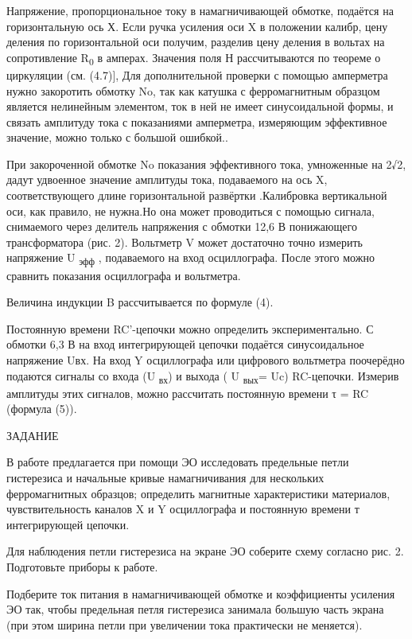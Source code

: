 \documentclass[]{article}
\begin{document}
Напряжение, пропорциональное току в намагничивающей обмотке, подаётся на
горизонтальную ось Х. Если ручка усиления оси X в положении калибр, цену
деления по горизонтальной оси получим, разделив цену деления в вольтах
на сопротивление R\textsubscript{0} в амперах. Значения поля Н
рассчитыва­ются по теореме о циркуляции (см. (4.7){]}, Для
дополнительной проверки с помощью амперметра нужно закоротить обмотку
No, так как катушка с ферромагнитным образцом является нелинейным
элементом, ток в ней не име­ет синусоидальной формы, и связать амплитуду
тока с показаниями амперметра, измеряющим эффективное значение, можно
только с большой ошибкой..

При закороченной обмотке No показания эффективного тока, умноженные на
2√2, дадут удвоенное значение амплитуды тока, подаваемого на ось X,
соответствующего длине горизонтальной развёртки .Калибровка вертикальной
оси, как правило, не нужна.Но она может проводиться с помощью сигнала,
снимаемого через делитель напряжения с обмотки 12,6 В понижающего
трансформатора (рис. 2). Вольтметр V может достаточно точно измерить
напряжение U \textsubscript{эфф} , подаваемого на вход осциллографа.
После этого можно сравнить показания осциллографа и вольтметра.

Величина индукции B рассчитывается по формуле (4).

Постоянную времени RC'-цепочки можно определить экспери­ментально. С
обмотки 6,3 В на вход интегрирующей цепочки подаётся синусоидальное
напряжение Uвх. На вход Y осциллографа или цифрового вольтметра
поочерёдно подаются сигналы со входа (U \textsubscript{вх}) и выхода ( U
\textsubscript{вых}= Uc) RC-цепочки. Измерив амплитуды этих сигналов,
можно рассчитать постоянную времени τ = RC (формула (5)).

ЗАДАНИЕ

В работе предлагается при помощи ЭО исследовать предельные пет­ли
гистерезиса и начальные кривые намагничивания для нескольких
ферромагнитных образцов; определить магнитные характеристики
ма­териалов, чувствительность каналов X и Y осциллографа и постоянную
времени т интегрирующей цепочки.

Для наблюдения петли гистерезиса на экране ЭО соберите схему со­гласно
рис. 2. Подготовьте приборы к работе.

Подберите ток питания в намагничивающей обмотке и коэффициен­ты усиления
ЭО так, чтобы предельная петля гистерезиса занимала большую часть экрана
(при этом ширина петли при увеличении тока практически не меняется).
\end{document}
